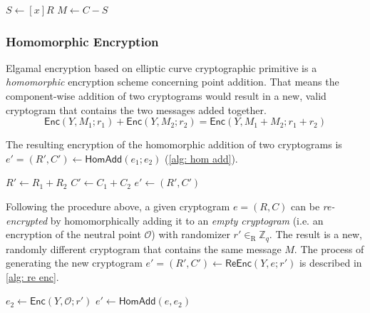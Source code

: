 \begin{algorithm}[ht]
    \DontPrintSemicolon
    \caption{$\mathsf{Dec} (x, e)$}
    \label{alg: dec}
    
    $S \gets [x]R$ \;
    $M \gets C - S$ \;
     
\end{algorithm}


\subsubsection{Homomorphic Encryption}
Elgamal encryption based on elliptic curve cryptographic primitive is a \textit{homomorphic} encryption scheme concerning point addition. That means the component-wise addition of two cryptograms would result in a new, valid cryptogram that contains the two messages added together.
\[
\mathsf{Enc}(Y, M_1; r_1) + \mathsf{Enc}(Y, M_2; r_2) = \mathsf{Enc}(Y, M_1 + M_2; r_1 + r_2)
\]

The resulting encryption of the homomorphic addition of two cryptograms is $e' = (R', C') \gets \mathsf{HomAdd} (e_1; e_2)$ (\cref{alg: hom add}).

\begin{algorithm}[ht]
    \DontPrintSemicolon
    \caption{$\mathsf{HomAdd}(e_1; e_2)$}
    \label{alg: hom add}
    
    $R' \gets R_1 + R_2$ \;
    $C' \gets C_1 + C_2$ \;
    $e' \gets (R', C')$\;
     
\end{algorithm}

Following the procedure above, a given cryptogram $e = (R, C)$ can be \textit{re-encrypted} by homomorphically adding it to an \textit{empty cryptogram} (i.e. an encryption of the neutral point $\mathcal{O}$) with randomizer $r' \in_\mathrm{R} \mathbb{Z}_q$. The result is a new, randomly different cryptogram that contains the same message $M$. The process of generating the new cryptogram $e' = (R', C') \gets \mathsf{ReEnc} (Y, e; r')$ is described in \cref{alg: re enc}.

\begin{algorithm}[ht]
    \DontPrintSemicolon
    \caption{$\mathsf{ReEnc} (Y, e; r')$}
    \label{alg: re enc}
    
    $e_2 \gets \mathsf{Enc}(Y, \mathcal{O}; r')$ 
    $e' \gets \mathsf{HomAdd} (e, e_2)$ 
     
\end{algorithm}

